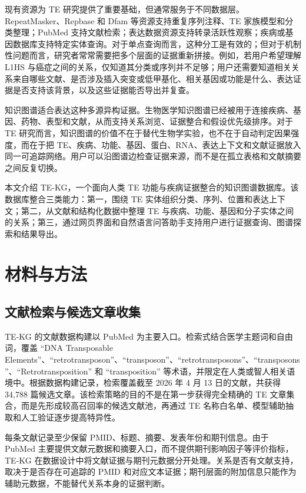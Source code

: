 \documentclass[12pt,a4paper,UTF8]{ctexart}
\begin{document}
现有资源为 TE 研究提供了重要基础，但通常服务于不同数据层。RepeatMasker、Repbase 和 Dfam 等资源支持重复序列注释、TE 家族模型和分类整理\cite{jurka2005repbase,smit2015repeatmasker,huber2016dfam,storer2021dfam}；PubMed 支持文献检索；表达数据资源支持转录活跃性观察；疾病或基因数据库支持特定实体查询。对于单点查询而言，这种分工是有效的；但对于机制性问题而言，研究者常常需要把多个层面的证据重新拼接。例如，若用户希望理解 L1HS 与癌症之间的关系，仅知道其分类或序列并不足够；用户还需要知道相关关系来自哪些文献、是否涉及插入突变或低甲基化、相关基因或功能是什么、表达证据是否支持该背景，以及这些证据能否导出并复查。

知识图谱适合表达这种多源异构证据。生物医学知识图谱已经被用于连接疾病、基因、药物、表型和文献，从而支持关系浏览、证据整合和假设优先级排序\cite{himmelstein2017hetionet,chandak2023building,huber2023kghub,morris2023spoke,sumer2021crossbar}。对于 TE 研究而言，知识图谱的价值不在于替代生物学实验，也不在于自动判定因果强度，而在于把 TE、疾病、功能、基因、蛋白、RNA、表达上下文和文献证据放入同一可追踪网络。用户可以沿图谱边检查证据来源，而不是在孤立表格和文献摘要之间反复切换。

本文介绍 TE-KG，一个面向人类 TE 功能与疾病证据整合的知识图谱数据库。该数据库整合三类能力：第一，围绕 TE 实体组织分类、序列、位置和表达上下文；第二，从文献和结构化数据中整理 TE 与疾病、功能、基因和分子实体之间的关系；第三，通过网页界面和自然语言问答助手支持用户进行证据查询、图谱探索和结果导出。

\section{材料与方法}

\subsection{文献检索与候选文章收集}

TE-KG 的文献数据构建以 PubMed 为主要入口。检索式结合医学主题词和自由词，覆盖 ``DNA Transposable Elements''、``retrotransposon''、``transposon''、``retrotransposons''、``transposons''、``Retrotransposition'' 和 ``transposition'' 等术语，并限定在人类或智人相关语境中。根据数据构建记录，检索覆盖截至 2026 年 4 月 13 日的文献，共获得 34,788 篇候选文章。该检索策略的目的不是在第一步获得完全精确的 TE 文章集合，而是先形成较高召回率的候选文献池，再通过 TE 名称白名单、模型辅助抽取和人工验证逐步提高特异性。

每条文献记录至少保留 PMID、标题、摘要、发表年份和期刊信息。由于 PubMed 主要提供文献元数据和摘要入口，而不提供期刊影响因子等评价指标\cite{pubmed_ncbi}，TE-KG 在数据设计中将文献证据与期刊元数据分开处理。关系是否有文献支持，取决于是否存在可追踪的 PMID 和对应文本证据；期刊层面的附加信息只能作为辅助元数据，不能替代关系本身的证据判断。
\end{document}
